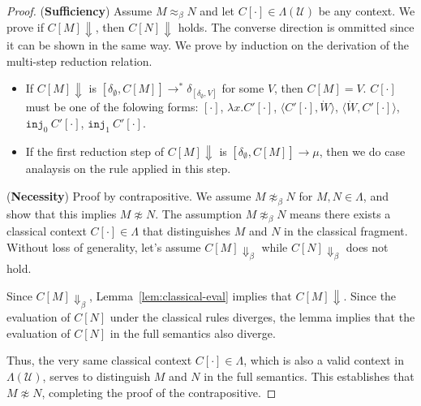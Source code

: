 \ConservTheorem*
\begin{proof}[Proof]
  (\textbf{Sufficiency})
  Assume $M\approx_\beta N$ and let $C[\cdot] \in \Lambda(\mathcal{U})$ be any context.
  We prove if $C[M] \Downarrow$, then $C[N] \Downarrow$ holds.
  The converse direction is ommitted since it can be shown in the same way.
  We prove by induction on the derivation of the multi-step reduction relation.
  \begin{itemize}
    \item If $C[M] \Downarrow$ is $[\delta_\emptyset, C[M]] \longrightarrow^* \delta_{[\delta_\emptyset,V]}$ for some $V$, then $C[M] = V$.
          $C[\cdot]$ must be one of the folowing forms: $[\cdot]$, $\lambda x.C'[\cdot]$, $\langle C'[\cdot], \dot{W}\rangle$, $\langle \dot{W}, C'[\cdot]\rangle$, $\texttt{inj}_0\ C'[\cdot]$, $\texttt{inj}_1\ C'[\cdot]$.
    \item If the first reduction step of $C[M] \Downarrow$ is $[\delta_\emptyset, C[M]] \longrightarrow \mu$, then we do case analaysis on the rule applied in this step.
  \end{itemize}
  (\textbf{Necessity})
  Proof by contrapositive.
  We assume $M \not\approx_{\beta} N$ for $M, N \in \Lambda$, and show that this implies $M \not\approx N$.
  The assumption $M \not\approx_{\beta} N$ means there exists a classical context $C[\cdot] \in \Lambda$ that distinguishes $M$ and $N$ in the classical fragment.
  Without loss of generality, let's assume $C[M] \Downarrow_\beta$ while $C[N] \Downarrow_\beta$ does not hold.

  Since $C[M] \Downarrow_\beta$, Lemma~\ref{lem:classical-eval} implies that $C[M] \Downarrow$.
  Since the evaluation of $C[N]$ under the classical rules diverges, the lemma implies that the evaluation of $C[N]$ in the full semantics also diverge.

  Thus, the very same classical context $C[\cdot] \in \Lambda$, which is also a valid context in $\Lambda(\mathcal{U})$, serves to distinguish $M$ and $N$ in the full semantics.
  This establishes that $M \not\approx N$, completing the proof of the contrapositive.
\end{proof}